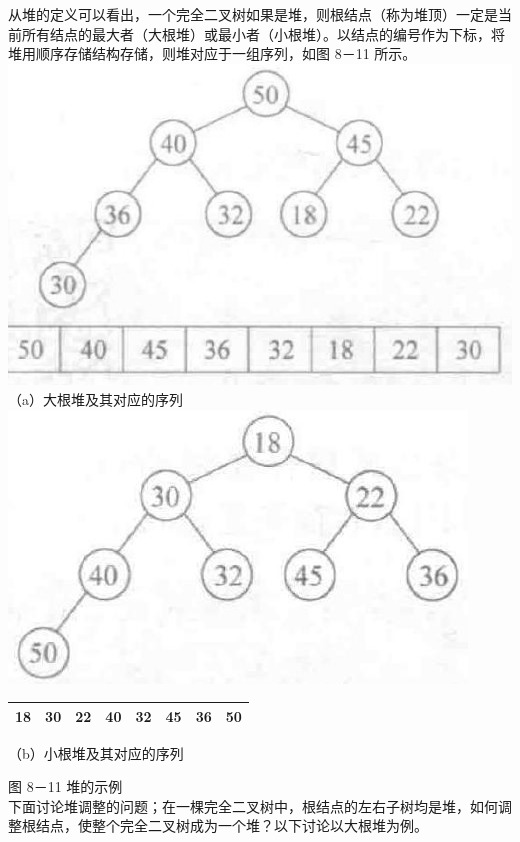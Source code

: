 \documentclass[10pt]{article}
\begin{document}
从堆的定义可以看出，一个完全二叉树如果是堆，则根结点（称为堆顶）一定是当前所有结点的最大者（大根堆）或最小者（小根堆）。以结点的编号作为下标，将堆用顺序存储结构存储，则堆对应于一组序列，如图 8－11 所示。\\
\includegraphics[max width=\textwidth, center]{2025_06_06_704745ea57b15b2333e5g-282}\\
（a）大根堆及其对应的序列\\
\includegraphics[max width=\textwidth, center]{2025_06_06_704745ea57b15b2333e5g-282(1)}

\begin{center}
\begin{tabular}{|l|l|l|l|l|l|l|l|}
\hline
18 & 30 & 22 & 40 & 32 & 45 & 36 & 50 \\
\hline
\end{tabular}
\end{center}

（b）小根堆及其对应的序列

图 8－11 堆的示例\\
下面讨论堆调整的问题；在一棵完全二叉树中，根结点的左右子树均是堆，如何调整根结点，使整个完全二叉树成为一个堆？以下讨论以大根堆为例。
\end{document}
